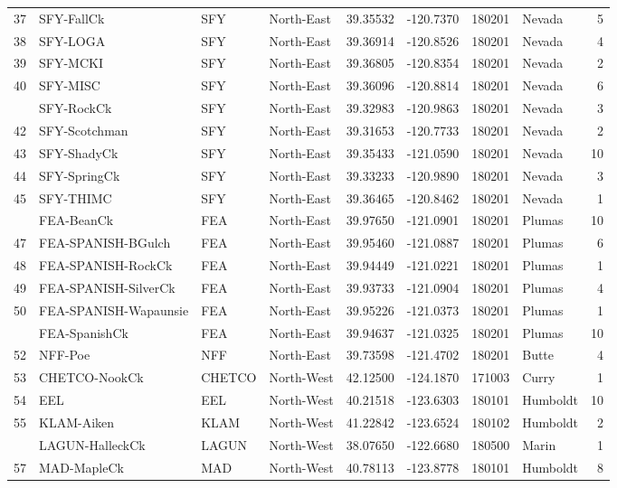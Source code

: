 \documentclass[proquest,12pt,final]{ucthesis-CA2012} %
\begin{document}
\begin{ucmainmatter}
\begin{longtable}[t]{r>{\raggedright\arraybackslash}p{9em}llrrr>{\raggedright\arraybackslash}p{5em}r}
37 & SFY-FallCk & SFY & North-East & 39.35532 & -120.7370 & 180201 & Nevada & 5\\
38 & SFY-LOGA & SFY & North-East & 39.36914 & -120.8526 & 180201 & Nevada & 4\\
39 & SFY-MCKI & SFY & North-East & 39.36805 & -120.8354 & 180201 & Nevada & 2\\
40 & SFY-MISC & SFY & North-East & 39.36096 & -120.8814 & 180201 & Nevada & 6\\
\addlinespace
41 & SFY-RockCk & SFY & North-East & 39.32983 & -120.9863 & 180201 & Nevada & 3\\
42 & SFY-Scotchman & SFY & North-East & 39.31653 & -120.7733 & 180201 & Nevada & 2\\
43 & SFY-ShadyCk & SFY & North-East & 39.35433 & -121.0590 & 180201 & Nevada & 10\\
44 & SFY-SpringCk & SFY & North-East & 39.33233 & -120.9890 & 180201 & Nevada & 3\\
45 & SFY-THIMC & SFY & North-East & 39.36465 & -120.8462 & 180201 & Nevada & 1\\
\addlinespace
46 & FEA-BeanCk & FEA & North-East & 39.97650 & -121.0901 & 180201 & Plumas & 10\\
47 & FEA-SPANISH-BGulch & FEA & North-East & 39.95460 & -121.0887 & 180201 & Plumas & 6\\
48 & FEA-SPANISH-RockCk & FEA & North-East & 39.94449 & -121.0221 & 180201 & Plumas & 1\\
49 & FEA-SPANISH-SilverCk & FEA & North-East & 39.93733 & -121.0904 & 180201 & Plumas & 4\\
50 & FEA-SPANISH-Wapaunsie & FEA & North-East & 39.95226 & -121.0373 & 180201 & Plumas & 1\\
\addlinespace
51 & FEA-SpanishCk & FEA & North-East & 39.94637 & -121.0325 & 180201 & Plumas & 10\\
52 & NFF-Poe & NFF & North-East & 39.73598 & -121.4702 & 180201 & Butte & 4\\
53 & CHETCO-NookCk & CHETCO & North-West & 42.12500 & -124.1870 & 171003 & Curry & 1\\
54 & EEL & EEL & North-West & 40.21518 & -123.6303 & 180101 & Humboldt & 10\\
55 & KLAM-Aiken & KLAM & North-West & 41.22842 & -123.6524 & 180102 & Humboldt & 2\\
\addlinespace
56 & LAGUN-HalleckCk & LAGUN & North-West & 38.07650 & -122.6680 & 180500 & Marin & 1\\
57 & MAD-MapleCk & MAD & North-West & 40.78113 & -123.8778 & 180101 & Humboldt & 8\\

\end{longtable}
\end{ucmainmatter}
\end{document}
